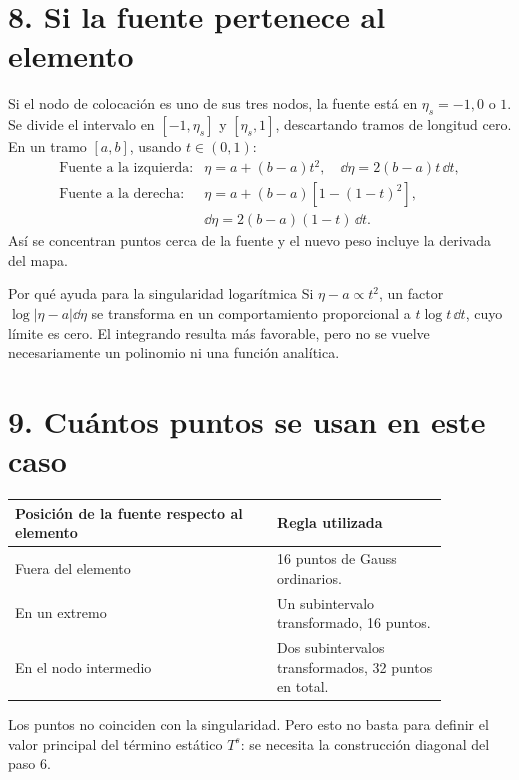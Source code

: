 \documentclass[11pt]{article}
\begin{document}
\section*{8. Si la fuente pertenece al elemento}
Si el nodo de colocación es uno de sus tres nodos, la fuente está en
\(\eta_s=-1,0\) o \(1\). Se divide el intervalo en
\([-1,\eta_s]\) y \([\eta_s,1]\), descartando tramos de longitud cero.
En un tramo \([a,b]\), usando \(t\in(0,1)\):
\[
\begin{array}{ll}
\text{Fuente a la izquierda:}&
\eta=a+(b-a)t^2,\quad \dd\eta=2(b-a)t\,\dd t,\\[1mm]
\text{Fuente a la derecha:}&
\eta=a+(b-a)[1-(1-t)^2],\\
&\dd\eta=2(b-a)(1-t)\,\dd t.
\end{array}
\]
Así se concentran puntos cerca de la fuente y el nuevo peso incluye la
derivada del mapa.

\begin{resultado}{Por qué ayuda para la singularidad logarítmica}
Si \(\eta-a\propto t^2\), un factor
\(\log|\eta-a|\dd\eta\) se transforma en un comportamiento proporcional a
\(t\log t\,\dd t\), cuyo límite es cero. El integrando resulta más favorable,
pero no se vuelve necesariamente un polinomio ni una función analítica.
\end{resultado}

\newpage
\section*{9. Cuántos puntos se usan en este caso}
\begin{center}
\begin{tabular}{p{0.52\linewidth}p{0.34\linewidth}}
\toprule
Posición de la fuente respecto al elemento & Regla utilizada\\
\midrule
Fuera del elemento & 16 puntos de Gauss ordinarios.\\
En un extremo & Un subintervalo transformado, 16 puntos.\\
En el nodo intermedio & Dos subintervalos transformados, 32 puntos en total.\\
\bottomrule
\end{tabular}
\end{center}
Los puntos no coinciden con la singularidad. Pero esto no basta para
definir el valor principal del término estático \(T^s\): se necesita
la construcción diagonal del paso 6.
\end{document}
